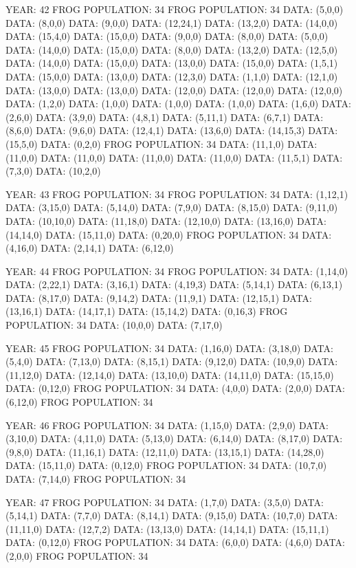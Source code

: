 \documentclass[12pt,a4paper]{article}
\begin{document}
{YEAR: 42
FROG POPULATION: 34
FROG POPULATION: 34
DATA: (5,0,0)
DATA: (8,0,0)
DATA: (9,0,0)
DATA: (12,24,1)
DATA: (13,2,0)
DATA: (14,0,0)
DATA: (15,4,0)
DATA: (15,0,0)
DATA: (9,0,0)
DATA: (8,0,0)
DATA: (5,0,0)
DATA: (14,0,0)
DATA: (15,0,0)
DATA: (8,0,0)
DATA: (13,2,0)
DATA: (12,5,0)
DATA: (14,0,0)
DATA: (15,0,0)
DATA: (13,0,0)
DATA: (15,0,0)
DATA: (1,5,1)
DATA: (15,0,0)
DATA: (13,0,0)
DATA: (12,3,0)
DATA: (1,1,0)
DATA: (12,1,0)
DATA: (13,0,0)
DATA: (13,0,0)
DATA: (12,0,0)
DATA: (12,0,0)
DATA: (12,0,0)
DATA: (1,2,0)
DATA: (1,0,0)
DATA: (1,0,0)
DATA: (1,0,0)
DATA: (1,6,0)
DATA: (2,6,0)
DATA: (3,9,0)
DATA: (4,8,1)
DATA: (5,11,1)
DATA: (6,7,1)
DATA: (8,6,0)
DATA: (9,6,0)
DATA: (12,4,1)
DATA: (13,6,0)
DATA: (14,15,3)
DATA: (15,5,0)
DATA: (0,2,0)
FROG POPULATION: 34
DATA: (11,1,0)
DATA: (11,0,0)
DATA: (11,0,0)
DATA: (11,0,0)
DATA: (11,0,0)
DATA: (11,5,1)
DATA: (7,3,0)
DATA: (10,2,0)

YEAR: 43
FROG POPULATION: 34
FROG POPULATION: 34
DATA: (1,12,1)
DATA: (3,15,0)
DATA: (5,14,0)
DATA: (7,9,0)
DATA: (8,15,0)
DATA: (9,11,0)
DATA: (10,10,0)
DATA: (11,18,0)
DATA: (12,10,0)
DATA: (13,16,0)
DATA: (14,14,0)
DATA: (15,11,0)
DATA: (0,20,0)
FROG POPULATION: 34
DATA: (4,16,0)
DATA: (2,14,1)
DATA: (6,12,0)

YEAR: 44
FROG POPULATION: 34
FROG POPULATION: 34
DATA: (1,14,0)
DATA: (2,22,1)
DATA: (3,16,1)
DATA: (4,19,3)
DATA: (5,14,1)
DATA: (6,13,1)
DATA: (8,17,0)
DATA: (9,14,2)
DATA: (11,9,1)
DATA: (12,15,1)
DATA: (13,16,1)
DATA: (14,17,1)
DATA: (15,14,2)
DATA: (0,16,3)
FROG POPULATION: 34
DATA: (10,0,0)
DATA: (7,17,0)

YEAR: 45
FROG POPULATION: 34
DATA: (1,16,0)
DATA: (3,18,0)
DATA: (5,4,0)
DATA: (7,13,0)
DATA: (8,15,1)
DATA: (9,12,0)
DATA: (10,9,0)
DATA: (11,12,0)
DATA: (12,14,0)
DATA: (13,10,0)
DATA: (14,11,0)
DATA: (15,15,0)
DATA: (0,12,0)
FROG POPULATION: 34
DATA: (4,0,0)
DATA: (2,0,0)
DATA: (6,12,0)
FROG POPULATION: 34

YEAR: 46
FROG POPULATION: 34
DATA: (1,15,0)
DATA: (2,9,0)
DATA: (3,10,0)
DATA: (4,11,0)
DATA: (5,13,0)
DATA: (6,14,0)
DATA: (8,17,0)
DATA: (9,8,0)
DATA: (11,16,1)
DATA: (12,11,0)
DATA: (13,15,1)
DATA: (14,28,0)
DATA: (15,11,0)
DATA: (0,12,0)
FROG POPULATION: 34
DATA: (10,7,0)
DATA: (7,14,0)
FROG POPULATION: 34

YEAR: 47
FROG POPULATION: 34
DATA: (1,7,0)
DATA: (3,5,0)
DATA: (5,14,1)
DATA: (7,7,0)
DATA: (8,14,1)
DATA: (9,15,0)
DATA: (10,7,0)
DATA: (11,11,0)
DATA: (12,7,2)
DATA: (13,13,0)
DATA: (14,14,1)
DATA: (15,11,1)
DATA: (0,12,0)
FROG POPULATION: 34
DATA: (6,0,0)
DATA: (4,6,0)
DATA: (2,0,0)
FROG POPULATION: 34

}
\end{document}
